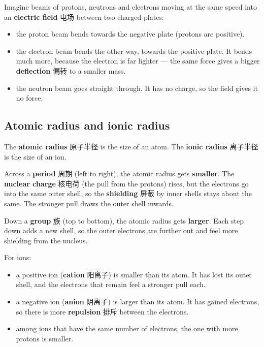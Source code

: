 \documentclass[11pt]{article}
\begin{document}
Imagine beams of protons, neutrons and electrons moving at the same speed into an \textbf{electric field} 电场 between two charged plates:

\begin{itemize}
\item the proton beam bends towards the negative plate (protons are positive).

\item the electron beam bends the other way, towards the positive plate. It bends much more, because the electron is far lighter — the same force gives a bigger \textbf{deflection} 偏转 to a smaller mass.

\item the neutron beam goes straight through. It has no charge, so the field gives it no force.

\end{itemize}

\subsection*{Atomic radius and ionic radius}

The \textbf{atomic radius} 原子半径 is the size of an atom. The \textbf{ionic radius} 离子半径 is the size of an ion.

Across a \textbf{period} 周期 (left to right), the atomic radius gets \textbf{smaller}. The \textbf{nuclear charge} 核电荷 (the pull from the protons) rises, but the electrons go into the same outer shell, so the \textbf{shielding} 屏蔽 by inner shells stays about the same. The stronger pull draws the outer shell inwards.

Down a \textbf{group} 族 (top to bottom), the atomic radius gets \textbf{larger}. Each step down adds a new shell, so the outer electrons are further out and feel more shielding from the nucleus.

For ions:

\begin{itemize}
\item a positive ion (\textbf{cation} 阳离子) is smaller than its atom. It has lost its outer shell, and the electrons that remain feel a stronger pull each.

\item a negative ion (\textbf{anion} 阴离子) is larger than its atom. It has gained electrons, so there is more \textbf{repulsion} 排斥 between the electrons.

\item among ions that have the same number of electrons, the one with more protons is smaller.

\end{itemize}
\end{document}
